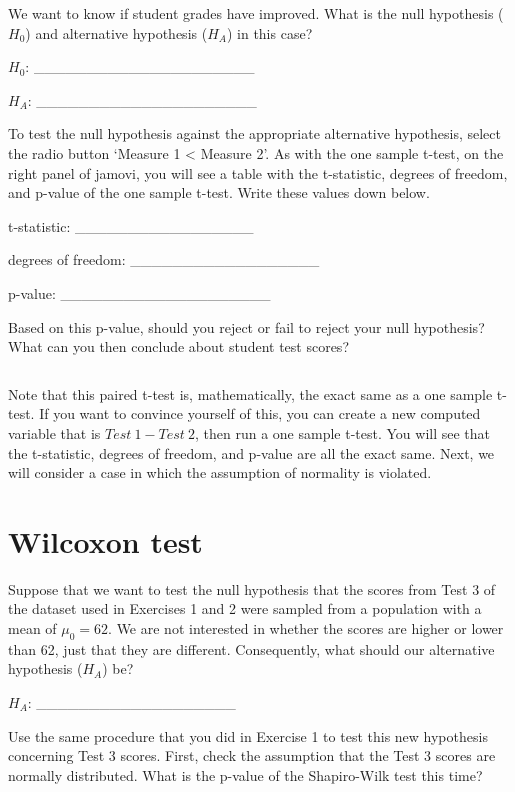 \documentclass[
  openany]{krantz}
\begin{document}
We want to know if student grades have improved.
What is the null hypothesis (\(H_{0}\)) and alternative hypothesis (\(H_{A}\)) in this case?

\(H_{0}\): \_\_\_\_\_\_\_\_\_\_\_\_\_\_\_\_\_\_\_\_\_

\(H_{A}\): \_\_\_\_\_\_\_\_\_\_\_\_\_\_\_\_\_\_\_\_\_

To test the null hypothesis against the appropriate alternative hypothesis, select the radio button `Measure 1 \textless{} Measure 2'.
As with the one sample t-test, on the right panel of jamovi, you will see a table with the t-statistic, degrees of freedom, and p-value of the one sample t-test.
Write these values down below.

t-statistic: \_\_\_\_\_\_\_\_\_\_\_\_\_\_\_\_\_

degrees of freedom: \_\_\_\_\_\_\_\_\_\_\_\_\_\_\_\_\_\_

p-value: \_\_\_\_\_\_\_\_\_\_\_\_\_\_\_\_\_\_\_\_

Based on this p-value, should you reject or fail to reject your null hypothesis?
What can you then conclude about student test scores?

\begin{verbatim}
\end{verbatim}

Note that this paired t-test is, mathematically, the exact same as a one sample t-test.
If you want to convince yourself of this, you can create a new computed variable that is \(Test\:1 - Test\:2\), then run a one sample t-test.
You will see that the t-statistic, degrees of freedom, and p-value are all the exact same.
Next, we will consider a case in which the assumption of normality is violated.

\hypertarget{wilcoxon-test-1}{%
\section{Wilcoxon test}\label{wilcoxon-test-1}}

Suppose that we want to test the null hypothesis that the scores from Test 3 of the dataset used in Exercises 1 and 2 were sampled from a population with a mean of \(\mu_{0} = 62\).
We are not interested in whether the scores are higher or lower than 62, just that they are different.
Consequently, what should our alternative hypothesis (\(H_{A}\)) be?

\(H_{A}\): \_\_\_\_\_\_\_\_\_\_\_\_\_\_\_\_\_\_\_

Use the same procedure that you did in Exercise 1 to test this new hypothesis concerning Test 3 scores.
First, check the assumption that the Test 3 scores are normally distributed.
What is the p-value of the Shapiro-Wilk test this time?
\end{document}
